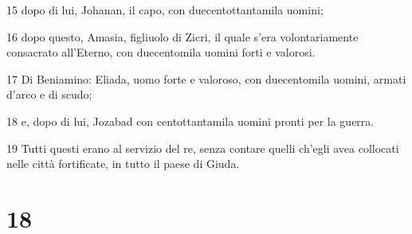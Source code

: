 \par 15 dopo di lui, Johanan, il capo, con duecentottantamila uomini;
\par 16 dopo questo, Amasia, figliuolo di Zicri, il quale s'era volontariamente consacrato all'Eterno, con duecentomila uomini forti e valorosi.
\par 17 Di Beniamino: Eliada, uomo forte e valoroso, con duecentomila uomini, armati d'arco e di scudo;
\par 18 e, dopo di lui, Jozabad con centottantamila uomini pronti per la guerra.
\par 19 Tutti questi erano al servizio del re, senza contare quelli ch'egli avea collocati nelle città fortificate, in tutto il paese di Giuda.

\chapter{18}

